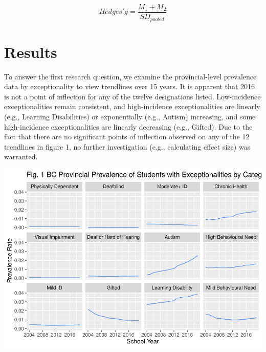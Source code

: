 \documentclass[
  english,
  man,floatsintext]{apa6}
\begin{document}
\[
Hedges' g = \frac{M_1 + M_2}{SD_{pooled}} 
\]

\hypertarget{results}{%
\section{Results}\label{results}}

To answer the first research question, we examine the provincial-level prevalence data by exceptionality to view trendlines over 15 years. It is apparent that 2016 is not a point of inflection for any of the twelve designations listed. Low-incidence exceptionalities remain consistent, and high-incidence exceptionalities are linearly (e.g., Learning Disabilities) or exponentially (e.g., Autism) increasing, and some high-incidence exceptionalities are linearly decreasing (e.g., Gifted). Due to the fact that there are no significant points of inflection observed on any of the 12 trendlines in figure 1, no further investigation (e.g., calculating effect size) was warranted.

\includegraphics{Final_project_files/figure-latex/Provinical_Data_Overview-1.pdf}
\end{document}

